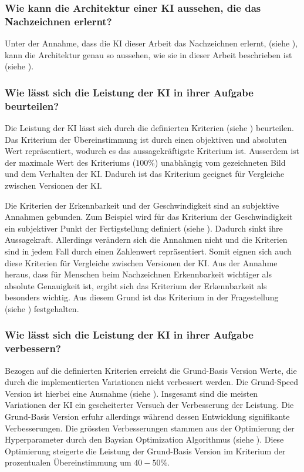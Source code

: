 \subsubsection*{Wie kann die Architektur einer KI aussehen, die das Nachzeichnen erlernt?}\label{subsub:d_frage_unter_1}
Unter der Annahme, dass die KI dieser Arbeit das Nachzeichnen erlernt, (siehe
), kann die Architektur genau so aussehen, wie sie in
dieser Arbeit beschrieben ist (siehe ).
 
\subsubsection*{Wie lässt sich die Leistung der KI in ihrer Aufgabe
beurteilen?}\label{subsub:d_frage_unter_2} Die Leistung der KI lässt sich durch
die definierten Kriterien (siehe ) beurteilen. Das
Kriterium der Übereinstimmung ist durch einen objektiven und absoluten Wert
repräsentiert, wodurch es das aussagekräftigste Kriterium ist. Ausserdem ist der
maximale Wert des Kriteriums ($100\%$) unabhängig vom gezeichneten Bild und dem
Verhalten der KI. Dadurch ist das Kriterium geeignet für Vergleiche zwischen
Versionen der KI.
 
Die Kriterien der Erkennbarkeit und der Geschwindigkeit sind an subjektive
Annahmen gebunden. Zum Beispiel wird für das Kriterium der Geschwindigkeit ein
subjektiver Punkt der Fertigstellung definiert (siehe
). Dadurch sinkt ihre Aussagekraft. Allerdings
verändern sich die Annahmen nicht und die Kriterien sind in jedem Fall durch
einen Zahlenwert repräsentiert. Somit eignen sich auch diese Kriterien für
Vergleiche zwischen Versionen der KI. Aus der Annahme heraus, dass für Menschen
beim Nachzeichnen Erkennbarkeit wichtiger als absolute Genauigkeit ist, ergibt
sich das Kriterium der Erkennbarkeit als besonders wichtig. Aus diesem Grund
ist das Kriterium in der Fragestellung (siehe )
festgehalten.
 
 
\subsubsection*{Wie lässt sich die Leistung der KI in ihrer Aufgabe verbessern?}\label{subsub:d_frage_unter_3}
Bezogen auf die definierten Kriterien erreicht die Grund-Basis Version Werte,
die durch die implementierten Variationen nicht verbessert werden. Die
Grund-Speed Version ist hierbei eine Ausnahme (siehe ).
Insgesamt sind die meisten Variationen der KI ein gescheiterter Versuch der
Verbesserung der Leistung. Die Grund-Basis Version erfuhr allerdings während
dessen Entwicklung signifikante Verbesserungen. Die grössten Verbesserungen
stammen aus der Optimierung der Hyperparameter durch den Baysian Optimization
Algorithmus (siehe ). Diese Optimierung steigerte
die Leistung der Grund-Basis Version im Kriterium der prozentualen
Übereinstimmung um $40-50\%$.
 
